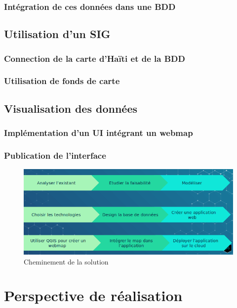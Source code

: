             \subsubsection{Intégration de ces données dans une BDD}
                
        \subsection{Utilisation d'un SIG}
            \subsubsection{Connection de la carte d'Haïti et de la BDD}
                
            \subsubsection{Utilisation de fonds de carte}
                
        \subsection{Visualisation des données} 
            \subsubsection{Implémentation d'un UI intégrant un webmap}
                
            \subsubsection{Publication de l'interface}
                
        \begin{figure}[t]
            \centering
            \includegraphics[width=1\textwidth]{images/Contexte/evolution_projetGIS.png}
            \caption{Cheminement de la solution}
        \end{figure}

    \section{Perspective de réalisation}
         